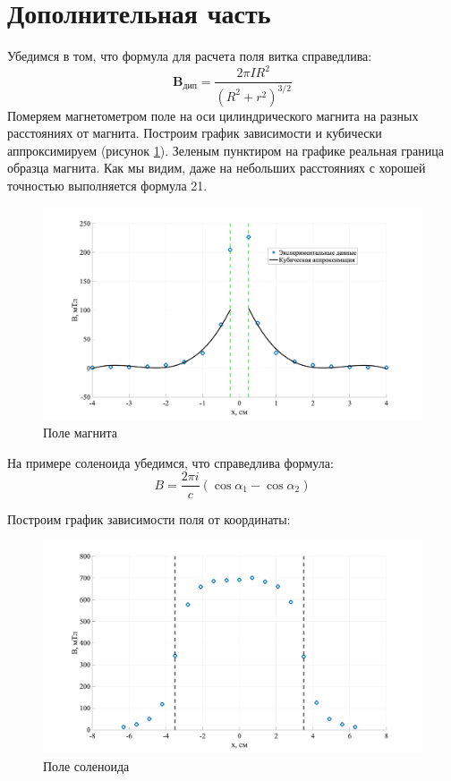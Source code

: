 \documentclass[a4paper, 12pt]{article}
\begin{document}
\section{Дополнительная часть}
Убедимся в том, что формула для расчета поля витка справедлива:
\begin{equation}
    \textbf{B}_\text{дип} = \frac{2 \pi I R^2}{(R^2 + r^2)^{3/2}}
\end{equation}
Померяем магнетометром поле на оси цилиндрического магнита на разных расстояниях от магнита. Построим график зависимости и кубически аппроксимируем (рисунок \ref{fig:plot3}). Зеленым пунктиром на графике реальная граница образца магнита. Как мы видим, даже на небольших расстояниях с хорошей точностью выполняется формула 21.
\begin{figure}[h]
    \centering
    \includegraphics[width=1\textwidth]{plot3}
    \caption{Поле магнита}
    \label{fig:plot3}
\end{figure}

На примере соленоида убедимся, что справедлива формула:
\begin{equation}
	B = \frac{2\pi i}{c} (\cos\alpha_1 - \cos\alpha_2)
\end{equation}

Построим график зависимости поля от координаты:
\begin{figure}[h]
    \centering
    \includegraphics[width=1\textwidth]{plot4}
    \caption{Поле соленоида}
    \label{fig:plot4}
\end{figure}
\end{document}
